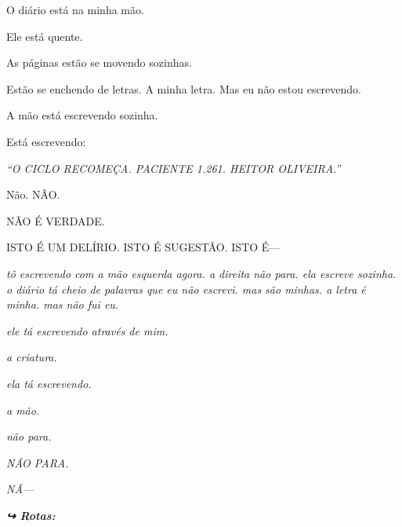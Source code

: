 \noindent O diário está na minha mão.

\noindent Ele está quente.

\noindent As páginas estão se movendo sozinhas.

\noindent Estão se enchendo de letras. A minha letra. Mas eu não estou escrevendo.

\noindent A mão está escrevendo sozinha.

\noindent Está escrevendo:

\noindent \textit{\textquotedblleft{}O CICLO RECOMEÇA. PACIENTE 1.261. HEITOR OLIVEIRA.\textquotedblright{}}

\noindent Não.
NÃO.

\noindent NÃO É VERDADE.

\noindent ISTO É UM DELÍRIO. ISTO É SUGESTÃO. ISTO É---

\noindent \textit{tô escrevendo com a mão esquerda agora. a direita não para. ela escreve sozinha. o diário tá cheio de palavras que eu não escrevi. mas são minhas. a letra é minha. mas não fui eu.}

\noindent \textit{ele tá escrevendo através de mim.}

\noindent \textit{a criatura.}

\noindent \textit{ela tá escrevendo.}

\noindent \textit{a mão.}

\noindent \textit{não para.}

\noindent \textit{NÃO PARA.}

\noindent \textit{NÃ---}

\vspace{0.5em}
\noindent\textit{\textbf{↪ Rotas:}  \rotasep {} \rotasep {}}
